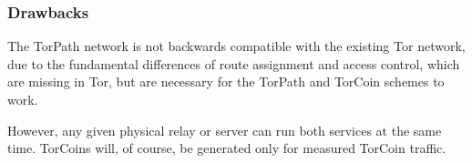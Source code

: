 \subsubsection{Drawbacks} The TorPath network is not backwards compatible with
the existing Tor network, due to the fundamental differences of route
assignment and access control, which are missing in Tor, but are necessary for
the TorPath and TorCoin schemes to work.

However, any given physical relay or server can run both services at the same
time. TorCoins will, of course, be generated only for measured TorCoin
traffic.
